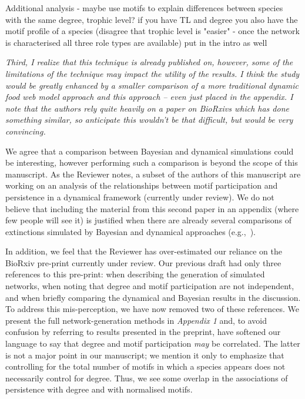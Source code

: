 \documentclass[12pt]{article}
\newcommand{\us}{\rm \setlength{\leftskip}{0.3cm} \setlength{\rightskip}{0.3cm}}
\newcommand{\them}{\it \setlength{\leftskip}{0cm} \setlength{\rightskip}{0cm}}
\begin{document}
\us
Additional analysis - maybe use motifs to explain differences between species with the same degree, trophic level?
if you have TL and degree you also have the motif profile of a species (disagree that trophic level is "easier" - once the network is characterised all three role types are available) put in the intro as well

\them
Third, I realize that this technique is already published on, however, some of the limitations of the technique may impact the utility of the results. I think the study would be greatly enhanced by a smaller comparison of a more traditional dynamic food web model approach and this approach – even just placed in the appendix. I note that the authors rely quite heavily on a paper on BioRxivs which has done something similar, so anticipate this wouldn’t be that difficult, but would be very convincing.

\us We agree that a comparison between Bayesian and dynamical simulations could be interesting, however performing such a comparison is beyond the scope of this manuscript. As the Reviewer notes, a subset of the authors of this manuscript are working on an analysis of the relationships between motif participation and persistence in a dynamical framework (currently under review). We do not believe that including the material from this second paper in an appendix (where few people will see it) is justified when there are already several comparisons of extinctions simulated by Bayesian and dynamical approaches (e.g.,~\citealp[]{Eklof2013a,others}).


In addition, we feel that the Reviewer has over-estimated our reliance on the BioRxiv pre-print currently under review. Our previous draft had only three references to this pre-print: when describing the generation of simulated networks, when noting that degree and motif participation are not independent, and when briefly comparing the dynamical and Bayesian results in the discussion.
To address this mis-perception, we have now removed two of these references.
We present the full network-generation methods in \emph{Appendix 1} and, to avoid confusion by referring to results presented in the preprint, have softened our language to say that degree and motif participation \emph{may} be correlated. 
The latter is not a major point in our manuscript; we mention it only to emphasize that controlling for the total number of motifs in which a species appears does not necessarily control for degree. 
Thus, we see some overlap in the associations of persistence with degree and with normalised motifs.
\end{document}
